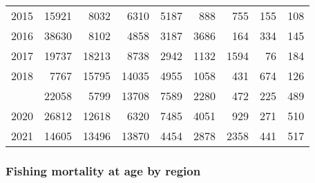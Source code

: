 \documentclass[
]{article}
\begin{document}
\begin{longtable}[t]{lrrrrrrrr}
2015 & 15921 & 8032 & 6310 & 5187 & 888 & 755 & 155 & 108\\
2016 & 38630 & 8102 & 4858 & 3187 & 3686 & 164 & 334 & 145\\
2017 & 19737 & 18213 & 8738 & 2942 & 1132 & 1594 & 76 & 184\\
2018 & 7767 & 15795 & 14035 & 4955 & 1058 & 431 & 674 & 126\\
\addlinespace
2019 & 22058 & 5799 & 13708 & 7589 & 2280 & 472 & 225 & 489\\
2020 & 26812 & 12618 & 6320 & 7485 & 4051 & 929 & 271 & 510\\
2021 & 14605 & 13496 & 13870 & 4454 & 2878 & 2358 & 441 & 517\\*
\end{longtable}

\hypertarget{fishing-mortality-at-age-by-region}{%
\subsubsection{Fishing mortality at age by
region}\label{fishing-mortality-at-age-by-region}}
\end{document}
